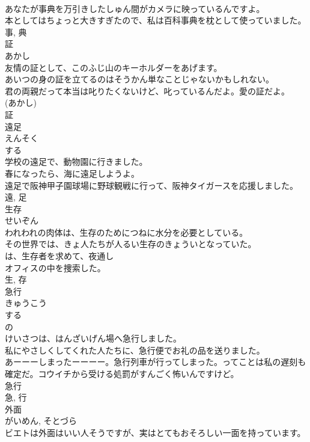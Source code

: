 \documentclass[8pt]{extreport}
\begin{document}
\begin{CJK}{UTF8}{min}
\\	あなたが事典を万引きしたしゅん間がカメラに映っているんですよ。	
\\	本としてはちょっと大きすぎたので、私は百科事典を枕として使っていました。	
\\	事, 典	
\\	証	
\\	あかし	
\\	友情の証として、このふじ山のキーホルダーをあげます。	
\\	あいつの身の証を立てるのはそうかん単なことじゃないかもしれない。	
\\	君の両親だって本当は叱りたくないけど、叱っているんだよ。愛の証だよ。	
\\	(あかし) 
\\	証	
\\	遠足	
\\	えんそく	
\\	する 
\\	学校の遠足で、動物園に行きました。	
\\	春になったら、海に遠足しようよ。	
\\	遠足で阪神甲子園球場に野球観戦に行って、阪神タイガースを応援しました。	
\\	遠, 足	
\\	生存	
\\	せいぞん	
\\	われわれの肉体は、生存のためにつねに水分を必要としている。	
\\	その世界では、きょ人たちが人るい生存のきょういとなっていた。	
\\	は、生存者を求めて、夜通し
\\	オフィスの中を捜索した。	
\\	生, 存	
\\	急行	
\\	きゅうこう	
\\	する 
\\	の 
\\	けいさつは、はんざいげん場へ急行しました。	
\\	私にやさしくしてくれた人たちに、急行便でお礼の品を送りました。	
\\	あーーーしまったーーーー。急行列車が行ってしまった。ってことは私の遅刻も確定だ。コウイチから受ける処罰がすんごく怖いんですけど。	
\\	急行 
\\	急, 行	
\\	外面	
\\	がいめん, そとづら	
\\	ビエトは外面はいい人そうですが、実はとてもおそろしい一面を持っています。	

\end{CJK}
\end{document}
